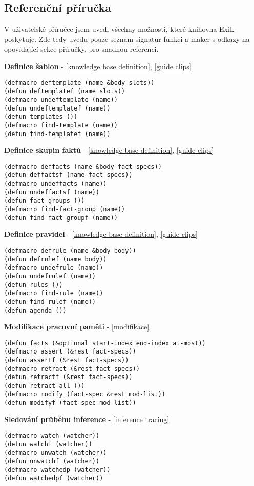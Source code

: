 \subsection{Referenční příručka}

V uživatelské příručce jsem uvedl všechny možnosti, které knihovna ExiL
poskytuje. Zde tedy uvedu pouze seznam signatur funkci a maker s odkazy na
opovídající sekce příručky, pro snadnou referenci.

\vspace{0.5cm}

\textbf{Definice šablon} - \ref{knowledge base definition}, \ref{guide clips}
\begin{verbatim}
(defmacro deftemplate (name &body slots))
(defun deftemplatef (name slots))
(defmacro undeftemplate (name))
(defun undeftemplatef (name))
(defun templates ())
(defmacro find-template (name))
(defun find-templatef (name))
\end{verbatim}

\textbf{Definice skupin faktů} - \ref{knowledge base definition}, \ref{guide clips}
\begin{verbatim}
(defmacro deffacts (name &body fact-specs))
(defun deffactsf (name fact-specs))
(defmacro undeffacts (name))
(defun undeffactsf (name))
(defun fact-groups ())
(defmacro find-fact-group (name))
(defun find-fact-groupf (name))
\end{verbatim}

\textbf{Definice pravidel} - \ref{knowledge base definition}, \ref{guide clips}
\begin{verbatim}
(defmacro defrule (name &body body))
(defun defrulef (name body))
(defmacro undefrule (name))
(defun undefrulef (name))
(defun rules ())
(defmacro find-rule (name))
(defun find-rulef (name))
(defun agenda ())
\end{verbatim}

\textbf{Modifikace pracovní paměti} - \ref{modifikace}
\begin{verbatim}
(defun facts (&optional start-index end-index at-most))
(defmacro assert (&rest fact-specs))
(defun assertf (&rest fact-specs))
(defmacro retract (&rest fact-specs))
(defun retractf (&rest fact-specs))
(defun retract-all ())
(defmacro modify (fact-spec &rest mod-list))
(defun modifyf (fact-spec mod-list))
\end{verbatim}

\textbf{Sledování průběhu inference} - \ref{inference tracing}
\begin{verbatim}
(defmacro watch (watcher))
(defun watchf (watcher))
(defmacro unwatch (watcher))
(defun unwatchf (watcher))
(defmacro watchedp (watcher))
(defun watchedpf (watcher))
\end{verbatim}

